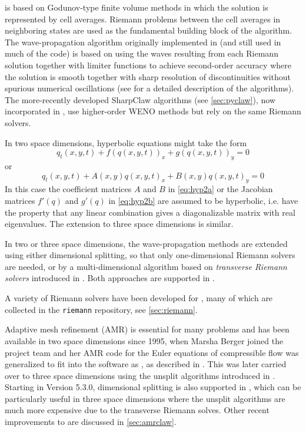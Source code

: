 \clawpack is based on Godunov-type finite volume methods in which
the solution is represented by cell averages.  Riemann problems
between the cell averages in neighboring states are used as the
fundamental building block of the algorithm.
The wave-propagation algorithm originally
implemented in \clawpack (and still used in much of the code) is based on
using the waves resulting from each Riemann solution together with limiter
functions to achieve second-order accuracy where the solution is smooth
together with sharp resolution of discontinuities without spurious numerical
oscillations (see \cite{rjl:fvmhp} for a detailed description of the
algorithms).   The more-recently developed SharpClaw algorithms (see
\cref{sec:pyclaw}), now incorporated in \pyclaw, use higher-order WENO methods
but rely on the same Riemann solvers.

In two space dimensions, hyperbolic equations might take the form
\begin{equation}\label{eq:hyp2a}
q_t(x,y,t) + f(q(x,y,t))_x + g(q(x,y,t))_y = 0
\end{equation}
or
\begin{equation}\label{eq:hyp2b}
q_t(x,y,t) + A(x,y)q(x,y,t)_x + B(x,y)q(x,y,t)_y = 0
\end{equation}
In this case the coefficient matrices $A$ and $B$ in \cref{eq:hyp2a}
or the Jacobian matrices $f'(q)$ and $g'(q)$ in \cref{eq:hyp2b} are
assumed to be hyperbolic, i.e. have the property that any linear
combination gives a diagonalizable matrix with real eigenvalues.  The
extension to three space dimensions is similar. 

In two or three space dimensions, the wave-propagation methods
are extended using either dimensional splitting, so that only
one-dimensional Riemann solvers are needed, or by a multi-dimensional
algorithm based on {\em transverse Riemann solvers} introduced in
\cite{rjl:wpalg}.  Both approaches are supported in \clawpack.

A variety of Riemann solvers have been developed for \clawpack, many
of which are collected in the \texttt{riemann} repository, see
\cref{sec:riemann}.  

Adaptive mesh refinement (AMR) is essential for many problems and
has been available in two space dimensions
since 1995, when Marsha Berger joined the project team and her AMR
code for the Euler equations of compressible flow was generalized to fit into
the software as \amrclaw, as described in \cite{Berger:1998ia}.  This was
later carried over to three space dimensions using the unsplit algorithms
introduced in \cite{jol-rjl:3d}.  Starting in Version 5.3.0, dimensional
splitting is also supported in \amrclaw, which can be particularly useful in
three space dimensions where the unsplit algorithms are much more expensive
due to the transverse Riemann solves.  Other recent improvements to \amrclaw
are discussed in \cref{sec:amrclaw}.
